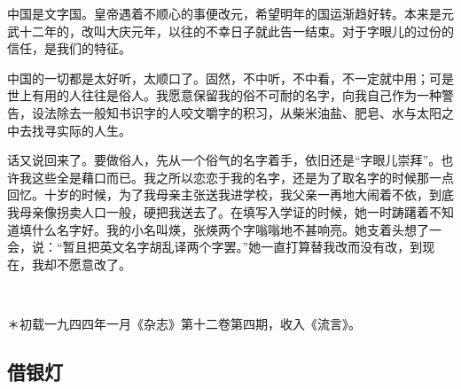 \par 中国是文字国。皇帝遇着不顺心的事便改元，希望明年的国运渐趋好转。本来是元武十二年的，改叫大庆元年，以往的不幸日子就此告一结束。对于字眼儿的过份的信任，是我们的特征。
\par 中国的一切都是太好听，太顺口了。固然，不中听，不中看，不一定就中用；可是世上有用的人往往是俗人。我愿意保留我的俗不可耐的名字，向我自己作为一种警告，设法除去一般知书识字的人咬文嚼字的积习，从柴米油盐、肥皂、水与太阳之中去找寻实际的人生。
\par 话又说回来了。要做俗人，先从一个俗气的名字着手，依旧还是“字眼儿崇拜”。也许我这些全是藉口而已。我之所以恋恋于我的名字，还是为了取名字的时候那一点回忆。十岁的时候，为了我母亲主张送我进学校，我父亲一再地大闹着不依，到底我母亲像拐卖人口一般，硬把我送去了。在填写入学证的时候，她一时踌躇着不知道填什么名字好。我的小名叫煐，张煐两个字嗡嗡地不甚响亮。她支着头想了一会，说：“暂且把英文名字胡乱译两个字罢。”她一直打算替我改而没有改，到现在，我却不愿意改了。
\par  
\par ＊初载一九四四年一月《杂志》第十二卷第四期，收入《流言》。


\subsection{借银灯}


